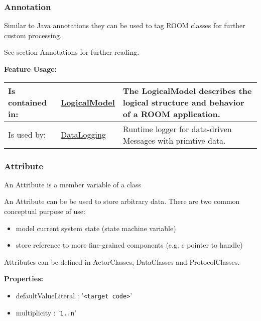 \subsubsection{Annotation}
	\hypertarget{ref:Annotation}{}
	Similar to Java annotations they can be used to tag ROOM classes for further custom processing.
		
	See section Annotations for further reading.
		
		
		
	\begingroup
	\textbf{Feature Usage:}
	\renewcommand{\arraystretch}{1.8} %
	\begin{longtable}{l|l p{}}
		\hline
	Is contained in: & \tabitem \hyperlink{ref:LogicalModel}{LogicalModel}  & The LogicalModel describes the logical structure and behavior of a ROOM application.\\
	\hline
	Is used by: & \tabitem \hyperlink{ref:DataLogging}{DataLogging}  & Runtime logger for data-driven Messages with primtive data.\\
	\hline
	\end{longtable}
	\endgroup
		
	
	\vspace{\baselineskip}
	\vspace{\baselineskip}
	\vspace{\baselineskip}
	
\subsubsection{Attribute}
	\hypertarget{ref:Attribute}{}
	An Attribute is a member variable of a class
		
	An Attribute can be be used to store arbitrary data. There are two common conceptual purpose of use:
	
	\begin{itemize}
		\item model current system state (state machine variable)
		\item store reference to more fine-grained components (e.g. c pointer to handle)
	\end{itemize}
	Attributes can be defined in ActorClasses, DataClasses and ProtocolClasses.
		
	\textbf{Properties:}
	\begin{itemize}
	\item defaultValueLiteral : '\verb|<target code>|'
	\item multiplicity : '\verb|1..n|'
	\end{itemize}
		

